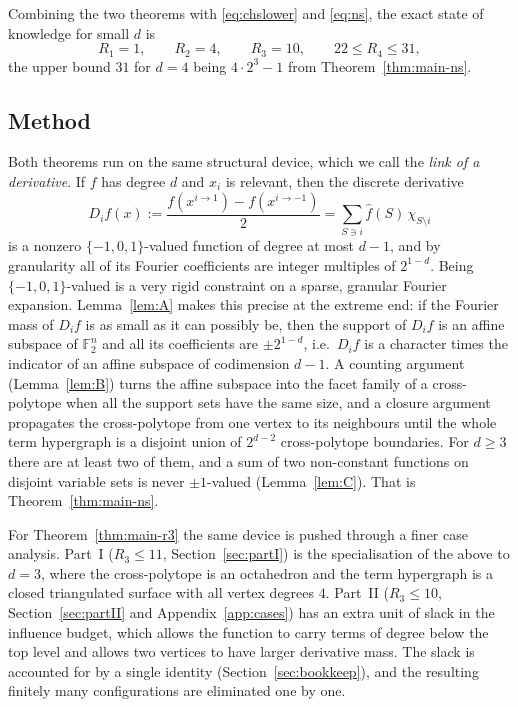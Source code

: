 \documentclass[11pt,reqno]{amsart}
\theoremstyle{plain}
\theoremstyle{definition}
\numberwithin{theorem}{section}
\newcommand{\bits}{\{-1,0,1\}}
\newcommand{\bbF}{\mathbb{F}}
\newcommand{\Fhat}[1]{\widehat{#1}}
\begin{document}
Combining the two theorems with \eqref{eq:chslower} and \eqref{eq:ns}, the exact state of
knowledge for small $d$ is
\[
  R_1 = 1, \qquad R_2 = 4, \qquad R_3 = 10, \qquad 22 \le R_4 \le 31,
\]
the upper bound $31$ for $d = 4$ being $4 \cdot 2^3 - 1$ from Theorem~\ref{thm:main-ns}.

\subsection{Method}
Both theorems run on the same structural device, which we call the \emph{link of a derivative}.
If $f$ has degree $d$ and $x_i$ is relevant, then the discrete derivative
\[
  D_i f(x) := \frac{f(x^{i \to 1}) - f(x^{i \to -1})}{2}
  = \sum_{S \ni i} \Fhat{f}(S)\, \chi_{S \setminus i}
\]
is a nonzero $\bits$-valued function of degree at most $d - 1$, and by granularity all of its
Fourier coefficients are integer multiples of $2^{1-d}$. Being $\bits$-valued is a very rigid
constraint on a sparse, granular Fourier expansion. Lemma~\ref{lem:A} makes this precise at the
extreme end: if the Fourier mass of $D_i f$ is as small as it can possibly be, then the support
of $D_i f$ is an affine subspace of $\bbF_2^n$ and all its coefficients are $\pm 2^{1-d}$, i.e.\
$D_i f$ is a character times the indicator of an affine subspace of codimension $d-1$. A
counting argument (Lemma~\ref{lem:B}) turns the affine subspace into the facet family of a
cross-polytope when all the support sets have the same size, and a closure argument propagates
the cross-polytope from one vertex to its neighbours until the whole term hypergraph is a
disjoint union of $2^{d-2}$ cross-polytope boundaries. For $d \ge 3$ there are at least two of
them, and a sum of two non-constant functions on disjoint variable sets is never $\pm1$-valued
(Lemma~\ref{lem:C}). That is Theorem~\ref{thm:main-ns}.

For Theorem~\ref{thm:main-r3} the same device is pushed through a finer case analysis. Part~I
($R_3 \le 11$, Section~\ref{sec:partI}) is the specialisation of the above to $d = 3$, where
the cross-polytope is an octahedron and the term hypergraph is a closed triangulated surface
with all vertex degrees $4$. Part~II ($R_3 \le 10$, Section~\ref{sec:partII} and
Appendix~\ref{app:cases}) has an extra unit of slack in the influence budget, which allows the
function to carry terms of degree below the top level and allows two vertices to have larger
derivative mass. The slack is accounted for by a single identity (Section~\ref{sec:bookkeep}),
and the resulting finitely many configurations are eliminated one by one.
\end{document}
